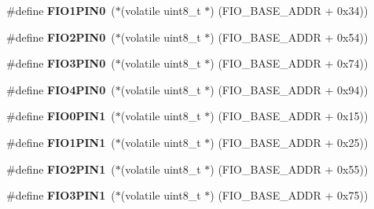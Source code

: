 \begin{DoxyCompactItemize}
\mbox{\label{group__lpc24xx__regs_gadeaf8820052fbb192564488b179bca1d}} 
\#define {\bfseries F\+I\+O1\+P\+I\+N0}~($\ast$(volatile uint8\+\_\+t $\ast$) (F\+I\+O\+\_\+\+B\+A\+S\+E\+\_\+\+A\+D\+DR + 0x34))
\item 
\mbox{\label{group__lpc24xx__regs_gaa9dc80dbdb8986b4658c50fc2f5eb44e}} 
\#define {\bfseries F\+I\+O2\+P\+I\+N0}~($\ast$(volatile uint8\+\_\+t $\ast$) (F\+I\+O\+\_\+\+B\+A\+S\+E\+\_\+\+A\+D\+DR + 0x54))
\item 
\mbox{\label{group__lpc24xx__regs_gaf8a80d168e3d5cedcb57c0069b7a88f4}} 
\#define {\bfseries F\+I\+O3\+P\+I\+N0}~($\ast$(volatile uint8\+\_\+t $\ast$) (F\+I\+O\+\_\+\+B\+A\+S\+E\+\_\+\+A\+D\+DR + 0x74))
\item 
\mbox{\label{group__lpc24xx__regs_ga2fd9321de6912e95044c750b46d3b0f1}} 
\#define {\bfseries F\+I\+O4\+P\+I\+N0}~($\ast$(volatile uint8\+\_\+t $\ast$) (F\+I\+O\+\_\+\+B\+A\+S\+E\+\_\+\+A\+D\+DR + 0x94))
\item 
\mbox{\label{group__lpc24xx__regs_gaec3cbb4aadad5e839c46a88e79235def}} 
\#define {\bfseries F\+I\+O0\+P\+I\+N1}~($\ast$(volatile uint8\+\_\+t $\ast$) (F\+I\+O\+\_\+\+B\+A\+S\+E\+\_\+\+A\+D\+DR + 0x15))
\item 
\mbox{\label{group__lpc24xx__regs_ga4b0692dc48bc4d3a16033328b52e906f}} 
\#define {\bfseries F\+I\+O1\+P\+I\+N1}~($\ast$(volatile uint8\+\_\+t $\ast$) (F\+I\+O\+\_\+\+B\+A\+S\+E\+\_\+\+A\+D\+DR + 0x25))
\item 
\mbox{\label{group__lpc24xx__regs_ga0819125e85bf212e84588420e5667771}} 
\#define {\bfseries F\+I\+O2\+P\+I\+N1}~($\ast$(volatile uint8\+\_\+t $\ast$) (F\+I\+O\+\_\+\+B\+A\+S\+E\+\_\+\+A\+D\+DR + 0x55))
\item 
\mbox{\label{group__lpc24xx__regs_ga08654d096e88cbe138ec2183a85bddce}} 
\#define {\bfseries F\+I\+O3\+P\+I\+N1}~($\ast$(volatile uint8\+\_\+t $\ast$) (F\+I\+O\+\_\+\+B\+A\+S\+E\+\_\+\+A\+D\+DR + 0x75))
\item 
\mbox{\label{group__lpc24xx__regs_gac6f041092aecda637317194e20a58012}} 

\end{DoxyCompactItemize}
